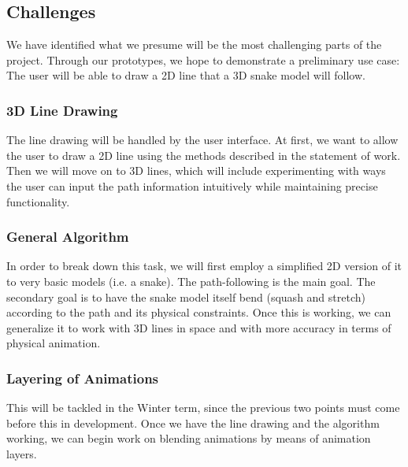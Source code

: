 \subsection{Challenges}
We have identified what we presume will be the most challenging parts of the project. Through our prototypes, we hope to demonstrate a preliminary use case: The user will be able to draw a 2D line that a 3D snake model will follow.

\subsubsection{3D Line Drawing}
The line drawing will be handled by the user interface. At first, we want to allow the user to draw a 2D line using the methods described in the statement of work. Then we will move on to 3D lines, which will include experimenting with ways the user can input the path information intuitively while maintaining precise functionality.
 
\subsubsection{General Algorithm}
In order to break down this task, we will first employ a simplified 2D version of it to very basic models (i.e. a snake). The path-following is the main goal. The secondary goal is to have the snake model itself bend (squash and stretch) according to the path and its physical constraints. Once this is working, we can generalize it to work with 3D lines in space and with more accuracy in terms of physical animation.

\subsubsection{Layering of Animations}
This will be tackled in the Winter term, since the previous two points must come before this in development. Once we have the line drawing and the algorithm working, we can begin work on blending animations by means of animation layers.

